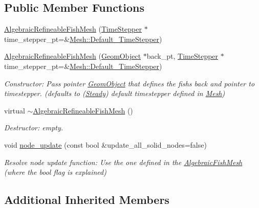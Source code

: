 \subsection*{Public Member Functions}
\begin{DoxyCompactItemize}
\item 
\hyperlink{classoomph_1_1AlgebraicRefineableFishMesh_afe4643b107e47fbad0c8836bc0516518}{Algebraic\+Refineable\+Fish\+Mesh} (\hyperlink{classoomph_1_1TimeStepper}{Time\+Stepper} $\ast$time\+\_\+stepper\+\_\+pt=\&\hyperlink{classoomph_1_1Mesh_a12243d0fee2b1fcee729ee5a4777ea10}{Mesh\+::\+Default\+\_\+\+Time\+Stepper})
\item 
\hyperlink{classoomph_1_1AlgebraicRefineableFishMesh_a04f6b6114c70638b4f26ac6b70f5c0fe}{Algebraic\+Refineable\+Fish\+Mesh} (\hyperlink{classoomph_1_1GeomObject}{Geom\+Object} $\ast$back\+\_\+pt, \hyperlink{classoomph_1_1TimeStepper}{Time\+Stepper} $\ast$time\+\_\+stepper\+\_\+pt=\&\hyperlink{classoomph_1_1Mesh_a12243d0fee2b1fcee729ee5a4777ea10}{Mesh\+::\+Default\+\_\+\+Time\+Stepper})
\begin{DoxyCompactList}\small\item\em Constructor\+: Pass pointer \hyperlink{classoomph_1_1GeomObject}{Geom\+Object} that defines the fish\textquotesingle{}s back and pointer to timestepper. (defaults to (\hyperlink{classoomph_1_1Steady}{Steady}) default timestepper defined in \hyperlink{classoomph_1_1Mesh}{Mesh}) \end{DoxyCompactList}\item 
virtual \hyperlink{classoomph_1_1AlgebraicRefineableFishMesh_a69145c9bf09e0fbc1a4bffe7bee379cd}{$\sim$\+Algebraic\+Refineable\+Fish\+Mesh} ()
\begin{DoxyCompactList}\small\item\em Destructor\+: empty. \end{DoxyCompactList}\item 
void \hyperlink{classoomph_1_1AlgebraicRefineableFishMesh_a8123da4b48355b39f19e0494a9d4545c}{node\+\_\+update} (const bool \&update\+\_\+all\+\_\+solid\+\_\+nodes=false)
\begin{DoxyCompactList}\small\item\em Resolve node update function\+: Use the one defined in the \hyperlink{classoomph_1_1AlgebraicFishMesh}{Algebraic\+Fish\+Mesh} (where the bool flag is explained) \end{DoxyCompactList}\end{DoxyCompactItemize}
\subsection*{Additional Inherited Members}


